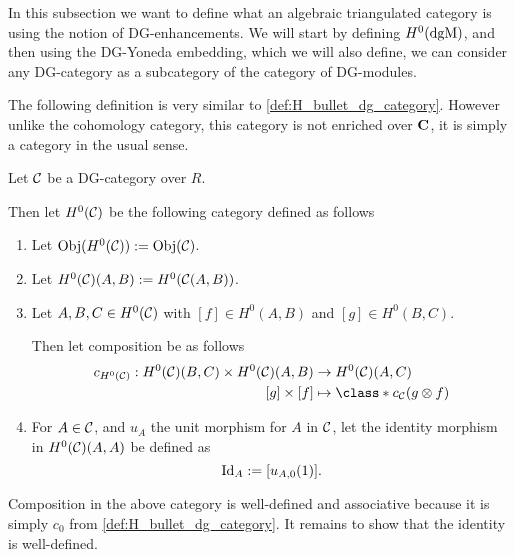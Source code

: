 In this subsection we want to define what an algebraic triangulated category is using the notion of DG-enhancements. We will start by defining \( H^0(\operatorname{dgM}) \), and then using the DG-Yoneda embedding, which we will also define, we can consider any DG-category as a subcategory of the category of DG-modules.

The following definition is very similar to \autoref{def:H_bullet_dg_category}. However unlike the cohomology category, this category is not enriched over \( \operatorname{\mathbf{C}} \), it is simply a category in the usual sense.

\begin{definition}
    \label{def:0_th_cohomology_of_dg_cat}
    Let \( {\mathcal{C}} \) be a DG-category over \( R \).

    Then let \( H^0({\mathcal{C}}) \) be the following category defined as follows
    \begin{enumerate}
        \item {
            Let \( \operatorname{Obj}(H^0({\mathcal{C}})) := \operatorname{Obj}({\mathcal{C}}) \).
        }
        \item {
            Let \( H^0({\mathcal{C}})(A, B) := H^0({\mathcal{C}}(A, B)) \).
        }
        \item {
            Let \( A, B, C \in H^0({\mathcal{C}}) \) with \( [f] \in H^0(A, B) \) and \( [g] \in H^0(B, C) \).

            Then let composition be as follows
            \begin{align*}
                c_{H^0(\Cc)}: H^0(\Cc)(B, C) \times H^0(\Cc)(A, B) &\to H^0(\Cc)(A, C) \\
                [g] \times [f] &\mapsto \class*{ c_{\Cc}(g \otimes f) }
            \end{align*}
        }
        \item {
            For \( A \in {\mathcal{C}} \), and \( u_A \) the unit morphism for \( A \) in \( {\mathcal{C}} \), let the identity morphism in \( H^0({\mathcal{C}})(A, A) \) be defined as
            \[
                \operatorname{Id}_A := [u_{A, 0} (1)].
            \]
        }
    \end{enumerate}
\end{definition}

Composition in the above category is well-defined and associative because it is simply \( c_0 \) from \autoref{def:H_bullet_dg_category}. It remains to show that the identity is well-defined.


